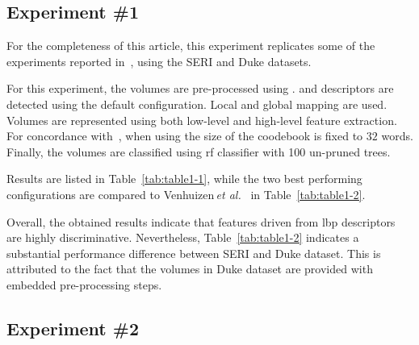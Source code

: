 \subsection{Experiment \#1}\label{subsec:exp1}

%
%
%

For the completeness of this article, this experiment replicates some of the experiments reported in~\cite{Lemaintre2015miccaiOCT}, using the SERI and Duke datasets.

For this experiment, the volumes are pre-processed using \nlm.
\lbp and \lbptop descriptors are detected using the default configuration.
Local and global mapping are used.
Volumes are represented using both low-level and high-level feature extraction. For concordance with~\cite{Lemaintre2015miccaiOCT}, when using \bow the size of the coodebook is fixed to $32$ words.
Finally, the volumes are classified using \ac{rf} classifier with 100 un-pruned trees.

Results are listed in Table~\ref{tab:table1-1}, while the two best performing configurations are compared to Venhuizen\,\textit{et al.}~\cite{Venhuizen2015} in Table~\ref{tab:table1-2}.

Overall, the obtained results indicate that features driven from \ac{lbp} descriptors are highly discriminative.
Nevertheless, Table~\ref{tab:table1-2} indicates a substantial performance difference between SERI and Duke dataset.
This is attributed to the fact that the volumes in Duke dataset are provided with embedded pre-processing steps.






\subsection{Experiment \#2}\label{subsec:exp2}
%
%
%
%

